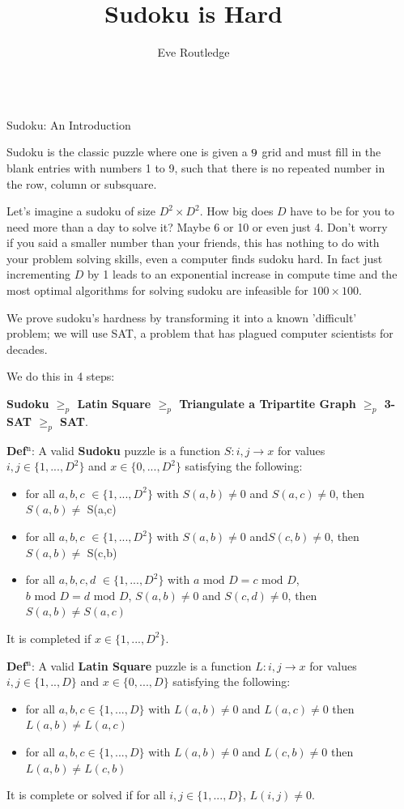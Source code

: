 \documentclass[final]{beamer}
\title{Sudoku is Hard}
\author{Eve Routledge}
\institute[shortinst]{Durham University, Supervisor: Prof. Peter Craig}
\newlength{\sepwidth}
\newlength{\colwidth}
\newcounter{row}
\newcounter{col}
\newcommand{\separatorcolumn}{\begin{column}{\sepwidth}\end{column}}
\begin{document}
\begin{frame}[t]
\begin{columns}[t]
\separatorcolumn

\begin{column}{\colwidth}
  \begin{exampleblock}{Sudoku: An Introduction}

Sudoku is the classic puzzle where one is given a $9\time 9$ grid and must fill in the blank entries with numbers 1 to 9, such that there is no repeated number in the row, column or subsquare.

Let's imagine a sudoku of size $D^2\times D^2$. How big does $D$ have to be for you to need more than a day to solve it? Maybe 6 or 10 or even just 4. Don't worry if you said a smaller number than your friends, this has nothing to do with your problem solving skills, even a computer finds sudoku hard. In fact just incrementing $D$ by 1 leads to an exponential increase in compute time and the most optimal algorithms for solving sudoku are infeasible for $100 \times 100$.

We prove sudoku's hardness by transforming it into a known 'difficult' problem; we will use SAT, a problem that has plagued computer scientists for decades. 

We do this in 4 steps:

   \textbf{Sudoku $\geq_p$ Latin Square $\geq_p$ Triangulate a Tripartite Graph $\geq_p$ 3-SAT $\geq_p$ SAT}.

	\textbf{Def$^\text{n}$}: A valid \textbf{Sudoku} puzzle is a function $ S: i,j \rightarrow x$ for values $i,j \in \{1,...,D^2\}$ and $x \in \{0,...,D^2\}$ satisfying the following:
\begin{itemize}
	\item{for all $a,b,c$  $\in \{1,...,D^2\}$ with $S(a,b)\neq 0$ and $S(a,c)\neq 0$, then $ S(a,b)\neq$ S(a,c) }
	\item{for all $a,b,c$  $\in \{1,...,D^2\}$ with $S(a,b)\neq 0$ and$ S(c,b)\neq 0$, then $S(a,b)\neq$ S(c,b) }
	\item{for all $ a,b,c,d $ $\in \{1,...,D^2\}$ with $a\text{ mod }D = c\text{ mod }D$, $b\text{ mod }D  =  d\text{ mod }D$, $S(a,b)\neq 0$  and $S(c,d) \neq 0$, then $S(a,b)\neq S(a,c)$ }
\end{itemize}
It is completed if $x \in \{1,...,D^2\}$.


\textbf{Def$^\text{n}$}: A valid \textbf{Latin Square} puzzle is a function $L:i,j \rightarrow x$ for values $i,j \in \{1,..,D\} $ and $x \in \{0,...,D\}$ satisfying the following:
\begin{itemize}
\item{for all $a,b,c \in \{1,...,D\}$ with $L(a,b) \neq 0 $ and $L(a,c) \neq 0$ then $L(a,b) \neq L(a,c)$}
\item{for all $a,b,c \in \{1,...,D\}$ with $L(a,b) \neq 0 $ and $L(c,b) \neq 0$ then $L(a,b) \neq L(c,b)$}
\end{itemize}
It is complete or solved if for all $i,j \in \{1,...,D\}$, $L(i,j) \neq 0$.


\end{exampleblock}
\end{column}
\end{columns}
\end{frame}
\end{document}
